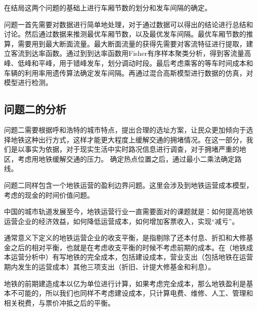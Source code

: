 \documentclass[12pt,a4paper]{mcmthesis}
\begin{document}
 在结局这两个问题的基础上进行车厢节数的划分和发车间隔的确定。




 {问题一首先需要对数据进行简单地处理，对于通过数据可以得出的结论进行总结和讨论。然后通过数据来推测最优车厢节数，以及最优发车间隔。最优车厢节数的推算，需要用到最大断面流量。最大断面流量的获得先需要对客流特征进行提取，建立客流到达率函数。通过到到达率函数用Fisher有序样本聚类分析，得到客流量高峰、低峰和平峰，用于错峰发车，划分调动时段。最后考虑乘客的等车时间成本和车辆的利用率用遗传算法确定发车间隔。再通过混合高斯模型进行数据的仿真，对模型进行检测。}


\subsection{问题二的分析}
问题二需要根据呼和浩特的城市特点，提出合理的选址方案，让民众更加倾向于选择地铁这种出行方式，这样才能更大程度上缓解交通的拥堵情况。在这一部分，我们是以事实为依据，对于现实生活中实时路况信息进行调查，对于拥堵严重的地区，考虑用地铁缓解交通的压力。
确定热点位置之后，通过最小二乘法确定路线。

{问题二同样包含一个地铁运营的盈利边界问题。这里会涉及到地铁运营成本模型，考虑的现金的时间价值问题。}
{中国的城市轨道发展至今，地铁运营行业一直需要面对的课题就是：如何提高地铁运营企业的经济效益，如何降低运营成本，如何增加客票收入，实现“减亏”。

通常意义下定义的地铁运营企业的收支平衡，是指剔除了还本付息、折扣和大修基金之后的相对平衡，也就是在考虑收支平衡的时候不考虑前期的成本。在（地铁成本运营分析中）有写地铁的完全成本，包括建设成本，营业支出（包括地铁在运营期内发生的运营成本）其他三项支出（折旧、计提大修基金和利息）。

地铁的前期建造成本以亿为单位进行计算，如果考虑完全成本，那么地铁盈利是基本不可能的，所以我们也同样不考虑建设成本，只计算电费、维修、人工、管理和相关税费，与票价冲抵之后的平衡。}
\end{document}
